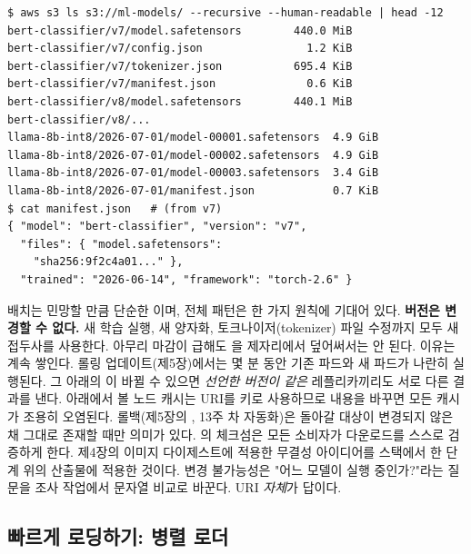 \begin{terminalbox}
\begin{Verbatim}[breaklines=true,breakanywhere=true,fontsize=\small,formatcom=\color{tbbtermfg},codes=\tbbcodeactive]
$ aws s3 ls s3://ml-models/ --recursive --human-readable | head -12
bert-classifier/v7/model.safetensors        440.0 MiB
bert-classifier/v7/config.json                1.2 KiB
bert-classifier/v7/tokenizer.json           695.4 KiB
bert-classifier/v7/manifest.json              0.6 KiB
bert-classifier/v8/model.safetensors        440.1 MiB
bert-classifier/v8/...
llama-8b-int8/2026-07-01/model-00001.safetensors  4.9 GiB
llama-8b-int8/2026-07-01/model-00002.safetensors  4.9 GiB
llama-8b-int8/2026-07-01/model-00003.safetensors  3.4 GiB
llama-8b-int8/2026-07-01/manifest.json            0.7 KiB
$ cat manifest.json   # (from v7)
{ "model": "bert-classifier", "version": "v7",
  "files": { "model.safetensors":
    "sha256:9f2c4a01..." },
  "trained": "2026-06-14", "framework": "torch-2.6" }
\end{Verbatim}
\end{terminalbox}

배치는 민망할 만큼 단순한 이며, 전체 패턴은 한 가지 원칙에 기대어 있다. \textbf{버전은 변경할 수 없다.} 새 학습 실행, 새 양자화, 토크나이저(tokenizer) 파일 수정까지 모두 새 접두사를 사용한다. 아무리 마감이 급해도 을 제자리에서 덮어써서는 안 된다. 이유는 계속 쌓인다. 롤링 업데이트(제5장)에서는 몇 분 동안 기존 파드와 새 파드가 나란히 실행된다. 그 아래의 이 바뀔 수 있으면 \textit{선언한 버전이 같은} 레플리카끼리도 서로 다른 결과를 낸다. 아래에서 볼 노드 캐시는 URI를 키로 사용하므로 내용을 바꾸면 모든 캐시가 조용히 오염된다. 롤백(제5장의 , 13주 차 자동화)은 돌아갈 대상이 변경되지 않은 채 그대로 존재할 때만 의미가 있다. 의 체크섬은 모든 소비자가 다운로드를 스스로 검증하게 한다. 제4장의 이미지 다이제스트에 적용한 무결성 아이디어를 스택에서 한 단계 위의 산출물에 적용한 것이다. 변경 불가능성은 "어느 모델이 실행 중인가?"라는 질문을 조사 작업에서 문자열 비교로 바꾼다. URI \textit{자체}가 답이다.

\subsection*{빠르게 로딩하기: 병렬 로더}

